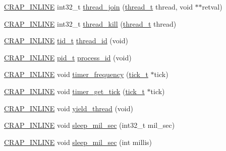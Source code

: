 \begin{DoxyCompactItemize}
\item 
\hyperlink{config__x86_8h_a5a40526b8d842e7ff731509998bb0f1c}{C\+R\+A\+P\+\_\+\+I\+N\+L\+I\+N\+E} int32\+\_\+t \hyperlink{namespacecrap_a35536de7a2ba9f607f3d53517a95aac0}{thread\+\_\+join} (\hyperlink{namespacecrap_acd6ada6ce68b7a664e02cc09a05cdeb3}{thread\+\_\+t} thread, void $\ast$$\ast$retval)
\item 
\hyperlink{config__x86_8h_a5a40526b8d842e7ff731509998bb0f1c}{C\+R\+A\+P\+\_\+\+I\+N\+L\+I\+N\+E} int32\+\_\+t \hyperlink{namespacecrap_a9783744db6635df7197a9376488e9839}{thread\+\_\+kill} (\hyperlink{namespacecrap_acd6ada6ce68b7a664e02cc09a05cdeb3}{thread\+\_\+t} thread)
\item 
\hyperlink{config__x86_8h_a5a40526b8d842e7ff731509998bb0f1c}{C\+R\+A\+P\+\_\+\+I\+N\+L\+I\+N\+E} \hyperlink{namespacecrap_ac21fdaa6d61c6dfcc98ddbb9fd7566ca}{tid\+\_\+t} \hyperlink{namespacecrap_a8731dc2eb590cb2c5862ba272eb835db}{thread\+\_\+id} (void)
\item 
\hyperlink{config__x86_8h_a5a40526b8d842e7ff731509998bb0f1c}{C\+R\+A\+P\+\_\+\+I\+N\+L\+I\+N\+E} \hyperlink{namespacecrap_a16bdcfd808340c5c364a5c78bbb1f39a}{pid\+\_\+t} \hyperlink{namespacecrap_acf701358da672704fd180515a2894a29}{process\+\_\+id} (void)
\item 
\hyperlink{config__x86_8h_a5a40526b8d842e7ff731509998bb0f1c}{C\+R\+A\+P\+\_\+\+I\+N\+L\+I\+N\+E} void \hyperlink{namespacecrap_a209752169516b0216153e610ac5b36e1}{timer\+\_\+frequency} (\hyperlink{namespacecrap_ad017b1c2078d1f4d59557eda5d95b149}{tick\+\_\+t} $\ast$tick)
\item 
\hyperlink{config__x86_8h_a5a40526b8d842e7ff731509998bb0f1c}{C\+R\+A\+P\+\_\+\+I\+N\+L\+I\+N\+E} void \hyperlink{namespacecrap_a13d2efa62f1d68349c9fef8d111e090f}{timer\+\_\+get\+\_\+tick} (\hyperlink{namespacecrap_ad017b1c2078d1f4d59557eda5d95b149}{tick\+\_\+t} $\ast$tick)
\item 
\hyperlink{config__x86_8h_a5a40526b8d842e7ff731509998bb0f1c}{C\+R\+A\+P\+\_\+\+I\+N\+L\+I\+N\+E} void \hyperlink{namespacecrap_a636675cc47b064d9890a2ee36b61086c}{yield\+\_\+thread} (void)
\item 
\hyperlink{config__x86_8h_a5a40526b8d842e7ff731509998bb0f1c}{C\+R\+A\+P\+\_\+\+I\+N\+L\+I\+N\+E} void \hyperlink{namespacecrap_a8ea97021fdc90a7926eb9b99890120cf}{sleep\+\_\+mil\+\_\+sec} (int32\+\_\+t mil\+\_\+sec)
\item 
\hyperlink{config__x86_8h_a5a40526b8d842e7ff731509998bb0f1c}{C\+R\+A\+P\+\_\+\+I\+N\+L\+I\+N\+E} void \hyperlink{namespacecrap_ad04916cefce97ea83d4dcede55fab370}{sleep\+\_\+mil\+\_\+sec} (int millis)
$$
\end{DoxyCompactItemize}
